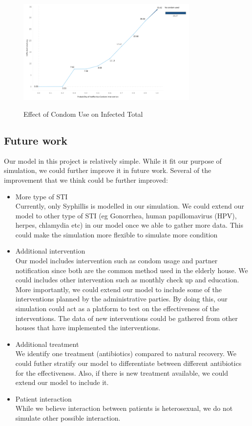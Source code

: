 \documentclass{article}
\begin{document}
\begin{normalsize}
\begin{figure}[H]
\caption{Effect of Condom Use on Infected Total }
\includegraphics[width=0.8\textwidth]{plt5.png}
\centering
\label{fig:plt4}
\end{figure}

\subsection{Future work}
Our model in this project is relatively simple. While it fit our purpose of simulation, we could further improve it in future work.
Several of the improvement that we think could be further improved:
\begin{itemize}
	\item More type of STI\\
	Currently, only Syphillis is modelled in our simulation. We could extend our model to other type of STI (eg Gonorrhea, human papillomavirus (HPV), herpes, chlamydia etc) in our model once we able to gather more data. This could make the simulation more flexible to simulate more condition
	\item Additional intervention\\
	Our  model includes intervention such as condom usage and partner notification since both are the common method used in the elderly house. We could includes other intervention such as monthly check up and education. More importantly, we could extend our model to include some of the interventions planned by the administrative parties. By doing this, our simulation could act as a platform to test on the effectiveness of the interventions. The data of new interventions could be gathered from other houses that have implemented the interventions.
	\item Additional treatment\\
	We identify one treatment (antibiotics) compared to natural recovery. We could futher stratify our model to differentiate between different antibiotics for the effectiveness. Also, if there is new treatment available, we could extend our model to include it.
	\item Patient interaction\\
	While we believe  interaction between patients is heterosexual, we do not simulate other possible interaction.
\end{itemize}


\end{normalsize}
\end{document}
